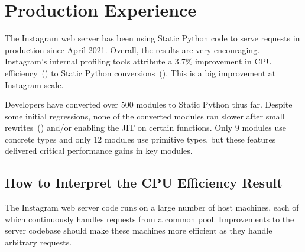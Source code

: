 \documentclass[english,cleveref,crc]{programming}
\newcommand{\SP}{Static Python}
\newcommand{\CPUchange}{3.7\%}
\begin{document}
\section{Production Experience}
\label{s:eval}




The Instagram web server has been using \SP{} code to serve requests in
production since April 2021.
Overall, the results are very encouraging.
Instagram's internal profiling tools attribute a \CPUchange{} improvement
in CPU efficiency~() to \SP{} conversions~().
This is a big improvement at Instagram scale.

Developers have converted over 500 modules to \SP{} thus far.
Despite some initial regressions, none of the converted modules
ran slower after small rewrites~()
and/or enabling the JIT on certain functions.
Only 9 modules use concrete types and only 12 modules use primitive types,
but these features delivered critical performance gains in key modules.



\subsection{How to Interpret the CPU Efficiency Result}
\label{s:what-is-cpu}

The Instagram web server code runs on a large number of host machines, each of
which continuously handles requests from a common pool.
Improvements to the server codebase should make these machines more efficient
as they handle arbitrary requests.
\end{document}
